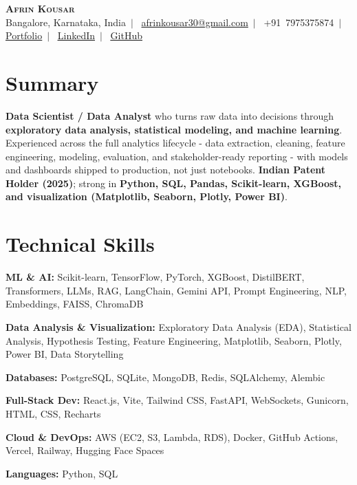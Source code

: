 \documentclass[letterpaper,9pt]{article}
\begin{document}
\begin{center}
  {\LARGE\scshape\textbf{Afrin Kousar}}\\\vspace{3pt}
  \footnotesize
  Bangalore, Karnataka, India~$|$~
  \href{mailto:afrinkousar30@gmail.com}{afrinkousar30@gmail.com}~$|$~
  +91~7975375874~$|$~
  \href{https://afrin-kousar.netlify.app/}{\underline{Portfolio}}~$|$~
  \href{https://linkedin.com/in/afrin-kousar}{\underline{LinkedIn}}~$|$~
  \href{https://github.com/afrin2315}{\underline{GitHub}}
\end{center}
\vspace{-7pt}

\section{Summary}
{\scriptsize
\textbf{Data Scientist / Data Analyst} who turns raw data into decisions through \textbf{exploratory data analysis, statistical modeling, and machine learning}. Experienced across the full analytics lifecycle - data extraction, cleaning, feature engineering, modeling, evaluation, and stakeholder-ready reporting - with models and dashboards shipped to production, not just notebooks. \textbf{Indian Patent Holder (2025)}; strong in \textbf{Python, SQL, Pandas, Scikit-learn, XGBoost, and visualization (Matplotlib, Seaborn, Plotly, Power BI)}.
}

\section{Technical Skills}
\begin{itemize}[leftmargin=0.1in,label={},itemsep=1pt,topsep=2pt,parsep=0pt]
  \scriptsize{
    \item \textbf{ML \& AI:} Scikit-learn, TensorFlow, PyTorch, XGBoost, DistilBERT, Transformers, LLMs, RAG, LangChain, Gemini API, Prompt Engineering, NLP, Embeddings, FAISS, ChromaDB
    \item \textbf{Data Analysis \& Visualization:} Exploratory Data Analysis (EDA), Statistical Analysis, Hypothesis Testing, Feature Engineering, Matplotlib, Seaborn, Plotly, Power BI, Data Storytelling
    \item \textbf{Databases:} PostgreSQL, SQLite, MongoDB, Redis, SQLAlchemy, Alembic
    \item \textbf{Full-Stack Dev:} React.js, Vite, Tailwind CSS, FastAPI, WebSockets, Gunicorn, HTML, CSS, Recharts
    \item \textbf{Cloud \& DevOps:} AWS (EC2, S3, Lambda, RDS), Docker, GitHub Actions, Vercel, Railway, Hugging Face Spaces
    \item \textbf{Languages:} Python, SQL
  }
\end{itemize}
\end{document}
